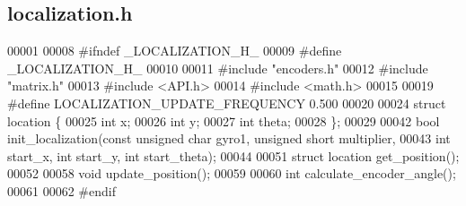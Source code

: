 \subsection{localization.\+h}
\label{localization_8h_source}

\begin{DoxyCode}
00001 
00008 \textcolor{preprocessor}{#ifndef \_LOCALIZATION\_H\_}
00009 \textcolor{preprocessor}{#define \_LOCALIZATION\_H\_}
00010 
00011 \textcolor{preprocessor}{#include "encoders.h"}
00012 \textcolor{preprocessor}{#include "matrix.h"}
00013 \textcolor{preprocessor}{#include <API.h>}
00014 \textcolor{preprocessor}{#include <math.h>}
00015 
00019 \textcolor{preprocessor}{#define LOCALIZATION\_UPDATE\_FREQUENCY 0.500}
00020 
00024 \textcolor{keyword}{struct }location \{
00025   \textcolor{keywordtype}{int} x;
00026   \textcolor{keywordtype}{int} y;
00027   \textcolor{keywordtype}{int} theta;
00028 \};
00029 
00042 \textcolor{keywordtype}{bool} init_localization(\textcolor{keyword}{const} \textcolor{keywordtype}{unsigned} \textcolor{keywordtype}{char} gyro1, \textcolor{keywordtype}{unsigned} \textcolor{keywordtype}{short} multiplier,
00043                        \textcolor{keywordtype}{int} start\_x, \textcolor{keywordtype}{int} start\_y, \textcolor{keywordtype}{int} start\_theta);
00044 
00051 \textcolor{keyword}{struct }location get_position();
00052 
00058 \textcolor{keywordtype}{void} update_position();
00059 
00060 \textcolor{keywordtype}{int} calculate_encoder_angle();
00061 
00062 \textcolor{preprocessor}{#endif}
\end{DoxyCode}
